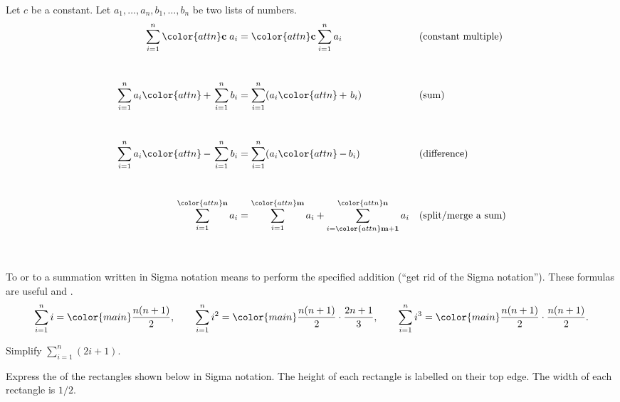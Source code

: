 \documentclass[../main.tex]{subfiles}
\begin{document}
\clearpage
\begin{mdframed}[style=withref-compact]
  \label{page:summation-properties}
  Let \(c\) be a constant. Let \(a_{1}, \dots, a_{n}, b_{1}, \dots, b_{n}\) be two lists of numbers. 
  \begin{align*}
    \sum_{i=1}^{n} {\color{attn} \mathbf{c}} \; a_{i} 
      &= {\color{attn} \mathbf{c}} \sum_{i=1}^{n} a_{i} 
      &&\text{(constant multiple)} \\[6ex]
      \sum_{i=1}^{n} a_{i} {\color{attn}\,\mathbf{+}\,} \sum_{i=1}^{n} b_{i} 
      &= \sum_{i=1}^{n} (a_{i} {\color{attn}\,\mathbf{+}\,}\, b_{i}) 
      &&\text{(sum)} \\[6ex]
      \sum_{i=1}^{n} a_{i} {\color{attn}\,\mathbf{-}\,} \sum_{i=1}^{n} b_{i} 
      &= \sum_{i=1}^{n} (a_{i} {\color{attn}\,\mathbf{-}\,} b_{i})
      && \text{(difference)} \\[6ex]
      \sum_{i=1}^{{\color{attn}\mathbf{n}}} a_{i} 
      &= 
      \sum_{i=1}^{{\color{attn}\mathbf{m}}} a_{i} + 
      \sum_{i={\color{attn}\mathbf{m+1}}}^{{\color{attn}\mathbf{n}}} a_{i} 
      && \text{(split/merge a sum)} \\[6ex]
  \end{align*}

\end{mdframed}

To  or to  a summation written in Sigma notation means to perform the specified addition (``get rid of the Sigma notation'').  These formulas are useful and .
\begin{equation} \label{formula:summations}
  \sum_{i=1}^{n} i = {\color{main} \frac{n(n+1)}{2}}, \qquad \sum_{i=1}^{n} i^{2} = {\color{main}\frac{n(n+1)}{2}} \cdot \frac{2n+1}{3}, \qquad \sum_{i=1}^{n} i^{3} = {\color{main}\frac{n(n+1)}{2}} \cdot \frac{n(n+1)}{2}.
\end{equation}

\begin{example}
  Simplify \(\sum_{i=1}^{n}(2i + 1)\).
\end{example}
\clearpage

\begin{example}
  Express the  of the rectangles shown below in Sigma notation. The height of each rectangle is labelled on their top edge. The width of each rectangle is \(1/2\).

  \begin{center}
    
  \end{center}
\end{example}
\clearpage
\end{document}
